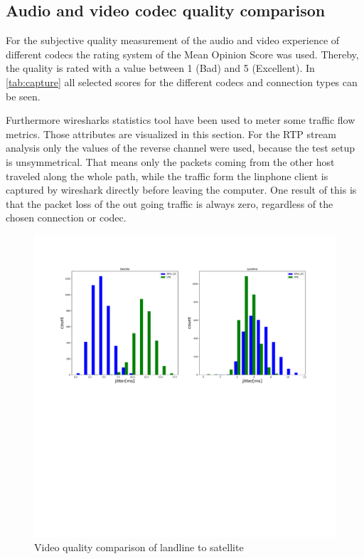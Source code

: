 \documentclass[parskip=full]{scrartcl}
\begin{document}
\subsection{Audio and video codec quality comparison} \label{subsec:audio}
For the subjective quality measurement of the audio and video experience of different codecs the rating system of the Mean Opinion Score was used.
Thereby, the quality is rated with a value between 1 (Bad) and 5 (Excellent). 
In \cref{tab:capture} all selected scores for the different codecs and connection types can be seen.

Furthermore wiresharks statistics tool have been used to meter some traffic flow metrics. Those attributes are visualized in this section. For the RTP stream analysis only the values of the reverse channel were used, because the test setup is unsymmetrical.
That means only the packets coming from the other host traveled along the whole path, while the traffic form the linphone client is captured by wireshark directly before leaving the computer.
One result of this is that the packet loss of the out going traffic is always zero, regardless of the chosen connection or codec.

\begin{figure}[!ht]
	\centering %
	\includegraphics[width=\textwidth]{images/comparison.pdf} %
	\caption{Video quality comparison of landline to satellite} 
	\label{fig:comparison} %
\end{figure} 
\end{document}
